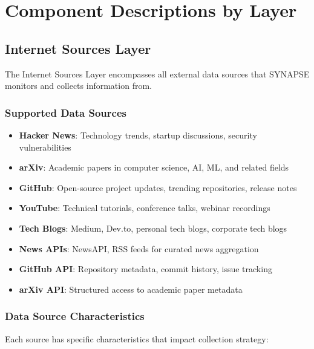 \documentclass[12pt,a4paper]{report}
\begin{document}
\chapter{Component Descriptions by Layer}

\section{Internet Sources Layer}

The Internet Sources Layer encompasses all external data sources that SYNAPSE monitors and collects information from.

\subsection{Supported Data Sources}

\begin{itemize}[label=\textbullet]
    \item \textbf{Hacker News}: Technology trends, startup discussions, security vulnerabilities
    \item \textbf{arXiv}: Academic papers in computer science, AI, ML, and related fields
    \item \textbf{GitHub}: Open-source project updates, trending repositories, release notes
    \item \textbf{YouTube}: Technical tutorials, conference talks, webinar recordings
    \item \textbf{Tech Blogs}: Medium, Dev.to, personal tech blogs, corporate tech blogs
    \item \textbf{News APIs}: NewsAPI, RSS feeds for curated news aggregation
    \item \textbf{GitHub API}: Repository metadata, commit history, issue tracking
    \item \textbf{arXiv API}: Structured access to academic paper metadata
\end{itemize}

\subsection{Data Source Characteristics}

Each source has specific characteristics that impact collection strategy:
\end{document}
